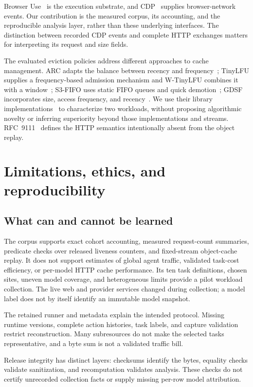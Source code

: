 \documentclass[10pt,sigconf,nonacm]{acmart}
\begin{document}
Browser Use~\cite{browseruse} is the execution substrate, and CDP~\cite{cdp} supplies browser-network events. Our contribution is the measured corpus, its accounting, and the reproducible analysis layer, rather than these underlying interfaces. The distinction between recorded CDP events and complete HTTP exchanges matters for interpreting its request and size fields.

The evaluated eviction policies address different approaches to cache management. ARC adapts the balance between recency and frequency~\cite{arc}; TinyLFU supplies a frequency-based admission mechanism and W-TinyLFU combines it with a window~\cite{tinylfu}; S3-FIFO uses static FIFO queues and quick demotion~\cite{s3fifo}; GDSF incorporates size, access frequency, and recency~\cite{gdsf}. We use their library implementations~\cite{libcachesim} to characterize two workloads, without proposing algorithmic novelty or inferring superiority beyond those implementations and streams. RFC~9111~\cite{rfc9111} defines the HTTP semantics intentionally absent from the object replay.

\section{Limitations, ethics, and reproducibility}
\label{sec:limits}
\subsection{What can and cannot be learned}
The corpus supports exact cohort accounting, measured request-count summaries, predicate checks over released liveness counters, and fixed-stream object-cache replay. It does not support estimates of global agent traffic, validated task-cost efficiency, or per-model HTTP cache performance. Its ten task definitions, chosen sites, uneven model coverage, and heterogeneous limits provide a pilot workload collection. The live web and provider services changed during collection; a model label does not by itself identify an immutable model snapshot.

The retained runner and metadata explain the intended protocol. Missing runtime versions, complete action histories, task labels, and capture validation restrict reconstruction. Many subresources do not make the selected tasks representative, and a byte sum is not a validated traffic bill.

Release integrity has distinct layers: checksums identify the bytes, equality checks validate sanitization, and recomputation validates analysis. These checks do not certify unrecorded collection facts or supply missing per-row model attribution.
\end{document}
